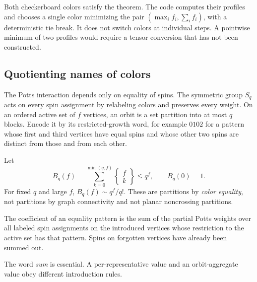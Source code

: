 Both checkerboard colors satisfy the theorem. The code computes their
profiles and chooses a single color minimizing the pair
$(\max_i f_i,\sum_i f_i)$, with a deterministic tie break.
It does not switch colors at individual steps. A pointwise minimum of two
profiles would require a tensor conversion that has not been constructed.

\subsection{Quotienting names of colors}

The Potts interaction depends only on equality of spins. The symmetric group
$S_q$ acts on every spin assignment by relabeling colors and preserves every
weight. On an ordered active set of $f$ vertices, an orbit is a set partition
into at most $q$ blocks. Encode it by its restricted-growth word, for example
$0102$ for a pattern whose first and third vertices have equal spins and
whose other two spins are distinct from those and from each other.

Let
\begin{equation}
 B_q(f)=\sum_{k=0}^{\min(q,f)}
             \left\{\begin{matrix}f\\k\end{matrix}\right\}
 \le q^f,\qquad B_q(0)=1.
 \label{eq:orbitcount}
\end{equation}
For fixed $q$ and large $f$, $B_q(f)\sim q^f/q!$.
These are partitions by \emph{color equality}, not partitions by graph
connectivity and not planar noncrossing partitions.

\begin{definition}
The coefficient of an equality pattern is the sum of the partial Potts
weights over all labeled spin assignments on the introduced vertices whose
restriction to the active set has that pattern. Spins on forgotten vertices
have already been summed out.
\end{definition}
The word \emph{sum} is essential. A per-representative value and an
orbit-aggregate value obey different introduction rules.

